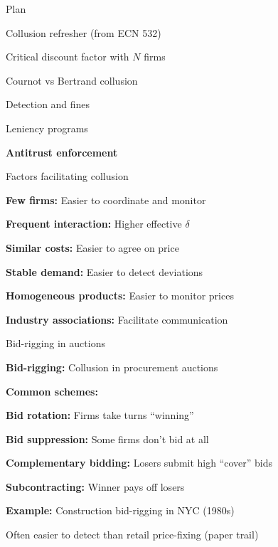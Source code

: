 \documentclass[notes,11pt, aspectratio=169]{beamer}
\newenvironment{wideitemize}{\itemize\addtolength{\itemsep}{10pt}}{\enditemize}
\newenvironment{wideenumerate}{\enumerate\addtolength{\itemsep}{10pt}}{\endenumerate}
\begin{document}
\begin{frame}{Plan}
  \begin{wideenumerate}
    \item Collusion refresher (from ECN 532)
    \item Critical discount factor with $N$ firms
    \item Cournot vs Bertrand collusion
    \item Detection and fines
    \item Leniency programs
    \item \textbf{Antitrust enforcement}
  \end{wideenumerate}
\end{frame}

\begin{frame}{Factors facilitating collusion}
	\begin{wideenumerate}
		\item \textbf{Few firms:} Easier to coordinate and monitor
		\item \textbf{Frequent interaction:} Higher effective $\delta$
		\item \textbf{Similar costs:} Easier to agree on price
		\item \textbf{Stable demand:} Easier to detect deviations
		\item \textbf{Homogeneous products:} Easier to monitor prices
		\item \textbf{Industry associations:} Facilitate communication
	\end{wideenumerate}
\end{frame}

\begin{frame}{Bid-rigging in auctions}
	\begin{wideitemize}
		\item \textbf{Bid-rigging:} Collusion in procurement auctions
		\item \textbf{Common schemes:}
		\begin{wideitemize}
			\vspace{5pt}
			\item \textbf{Bid rotation:} Firms take turns ``winning''
			\item \textbf{Bid suppression:} Some firms don't bid at all
			\item \textbf{Complementary bidding:} Losers submit high ``cover'' bids
			\item \textbf{Subcontracting:} Winner pays off losers
		\end{wideitemize}
		\item \textbf{Example:} Construction bid-rigging in NYC (1980s)
		\item Often easier to detect than retail price-fixing (paper trail)
	\end{wideitemize}
\end{frame}
\end{document}
